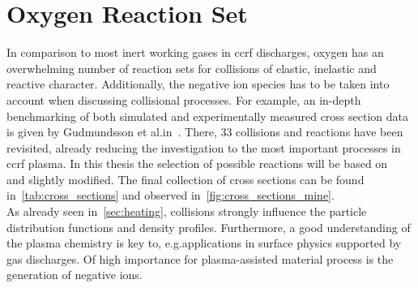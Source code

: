 %
	\section{Oxygen Reaction Set}\label{sec:negionphysics}
%
		In comparison to most inert working gases in ccrf discharges, oxygen has an overwhelming number of reaction sets for collisions of elastic, inelastic and reactive character. Additionally, the negative ion species has to be taken into account when discussing collisional processes. For example, an in-depth benchmarking of both simulated and experimentally measured cross section data is given by Gudmundsson et al.\@ in~\cite{Gudmundsson13}. There, 33 collisions and reactions have been revisited, already reducing the investigation to the most important processes in ccrf plasma. In this thesis the selection of possible reactions will be based on~\cite{Bronold07b} and slightly modified. The final collection of cross sections can be found in~\autoref{tab:cross_sections} and observed in~\autoref{fig:cross_sections_mine}.\\
		As already seen in~\autoref{sec:heating}, collisions strongly influence the particle distribution functions and density profiles. Furthermore, a good understanding of the plasma chemistry is key to, e.g.\@ applications in surface physics supported by gas discharges. Of high importance for plasma-assisted material process is the generation of negative ions.\\
%
